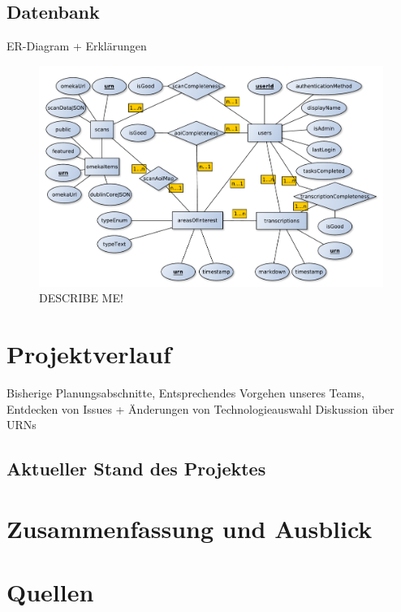 \documentclass{article}
\begin{document}
\subsection{Datenbank}
ER-Diagram + Erklärungen
\\\begin{figure}
\includegraphics[width=\textwidth]{../notes/ER.pdf}
\caption{DESCRIBE ME!}
\label{fig:er}
\end{figure}
\section{Projektverlauf}
Bisherige Planungsabschnitte,
Entsprechendes Vorgehen unseres Teams,
Entdecken von Issues + Änderungen von Technologieauswahl
Diskussion über URNs
\subsection{Aktueller Stand des Projektes}
\section{Zusammenfassung und Ausblick}
\section*{Quellen}

\nocite{*}

\end{document}
